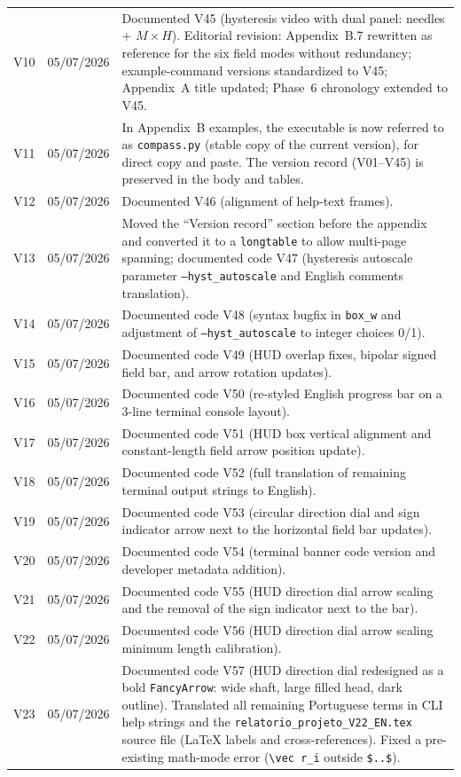 \documentclass[11pt,a4paper]{article}
\newcommand{\code}[1]{\texttt{#1}}
\begin{document}
\begin{tabular}{@{}lll@{}}
V10 & 05/07/2026 & Documented V45 (hysteresis video with dual panel: needles + $M\times H$). Editorial revision: Appendix~B.7 rewritten as reference for the six field modes without redundancy; example-command versions standardized to V45; Appendix~A title updated; Phase~6 chronology extended to V45. \\
V11 & 05/07/2026 & In Appendix~B examples, the executable is now referred to as \code{compass.py} (stable copy of the current version), for direct copy and paste. The version record (V01--V45) is preserved in the body and tables. \\
V12 & 05/07/2026 & Documented V46 (alignment of help-text frames). \\
V13 & 05/07/2026 & Moved the ``Version record'' section before the appendix and converted it to a \code{longtable} to allow multi-page spanning; documented code V47 (hysteresis autoscale parameter \code{--hyst\_autoscale} and English comments translation). \\
V14 & 05/07/2026 & Documented code V48 (syntax bugfix in \code{box\_w} and adjustment of \code{--hyst\_autoscale} to integer choices 0/1). \\
V15 & 05/07/2026 & Documented code V49 (HUD overlap fixes, bipolar signed field bar, and arrow rotation updates). \\
V16 & 05/07/2026 & Documented code V50 (re-styled English progress bar on a 3-line terminal console layout). \\
V17 & 05/07/2026 & Documented code V51 (HUD box vertical alignment and constant-length field arrow position update). \\
V18 & 05/07/2026 & Documented code V52 (full translation of remaining terminal output strings to English). \\
V19 & 05/07/2026 & Documented code V53 (circular direction dial and sign indicator arrow next to the horizontal field bar updates). \\
V20 & 05/07/2026 & Documented code V54 (terminal banner code version and developer metadata addition). \\
V21 & 05/07/2026 & Documented code V55 (HUD direction dial arrow scaling and the removal of the sign indicator next to the bar). \\
V22 & 05/07/2026 & Documented code V56 (HUD direction dial arrow scaling minimum length calibration). \\
V23 & 05/07/2026 & Documented code V57 (HUD direction dial redesigned as a bold \code{FancyArrow}: wide shaft, large filled head, dark outline). Translated all remaining Portuguese terms in CLI help strings and the \code{relatorio\_projeto\_V22\_EN.tex} source file (LaTeX labels and cross-references). Fixed a pre-existing math-mode error (\verb|\vec r_i| outside \code{\$..\$}). \\

\end{tabular}
\end{document}
